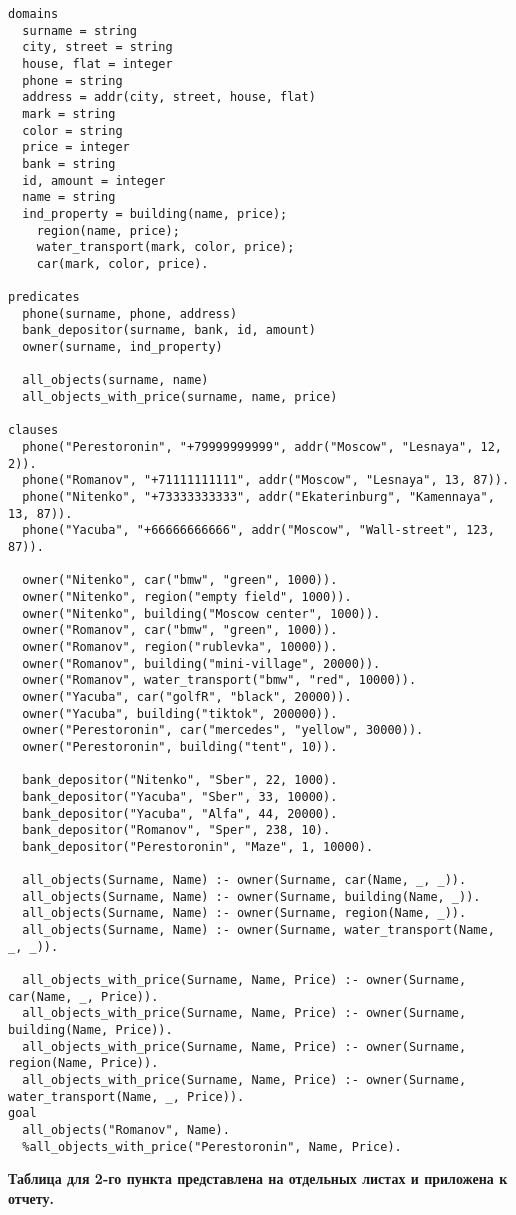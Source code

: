 \begin{lstlisting}
domains
  surname = string
  city, street = string
  house, flat = integer
  phone = string
  address = addr(city, street, house, flat)
  mark = string
  color = string
  price = integer
  bank = string
  id, amount = integer
  name = string
  ind_property = building(name, price);
    region(name, price);
    water_transport(mark, color, price);
    car(mark, color, price).
  
predicates
  phone(surname, phone, address)
  bank_depositor(surname, bank, id, amount)
  owner(surname, ind_property)

  all_objects(surname, name)
  all_objects_with_price(surname, name, price)
  
clauses
  phone("Perestoronin", "+79999999999", addr("Moscow", "Lesnaya", 12, 2)).
  phone("Romanov", "+71111111111", addr("Moscow", "Lesnaya", 13, 87)).
  phone("Nitenko", "+73333333333", addr("Ekaterinburg", "Kamennaya", 13, 87)).
  phone("Yacuba", "+66666666666", addr("Moscow", "Wall-street", 123, 87)).

  owner("Nitenko", car("bmw", "green", 1000)).
  owner("Nitenko", region("empty field", 1000)).
  owner("Nitenko", building("Moscow center", 1000)).
  owner("Romanov", car("bmw", "green", 1000)).
  owner("Romanov", region("rublevka", 10000)).
  owner("Romanov", building("mini-village", 20000)).
  owner("Romanov", water_transport("bmw", "red", 10000)).
  owner("Yacuba", car("golfR", "black", 20000)).
  owner("Yacuba", building("tiktok", 200000)).
  owner("Perestoronin", car("mercedes", "yellow", 30000)).
  owner("Perestoronin", building("tent", 10)).

  bank_depositor("Nitenko", "Sber", 22, 1000).
  bank_depositor("Yacuba", "Sber", 33, 10000).
  bank_depositor("Yacuba", "Alfa", 44, 20000).
  bank_depositor("Romanov", "Sper", 238, 10).
  bank_depositor("Perestoronin", "Maze", 1, 10000).

  all_objects(Surname, Name) :- owner(Surname, car(Name, _, _)).
  all_objects(Surname, Name) :- owner(Surname, building(Name, _)).
  all_objects(Surname, Name) :- owner(Surname, region(Name, _)).
  all_objects(Surname, Name) :- owner(Surname, water_transport(Name, _, _)).

  all_objects_with_price(Surname, Name, Price) :- owner(Surname, car(Name, _, Price)).
  all_objects_with_price(Surname, Name, Price) :- owner(Surname, building(Name, Price)).
  all_objects_with_price(Surname, Name, Price) :- owner(Surname, region(Name, Price)).
  all_objects_with_price(Surname, Name, Price) :- owner(Surname, water_transport(Name, _, Price)).
goal
  all_objects("Romanov", Name).
  %all_objects_with_price("Perestoronin", Name, Price).
\end{lstlisting}

\textbf{Таблица для 2-го пункта представлена на отдельных листах и приложена к отчету.}

